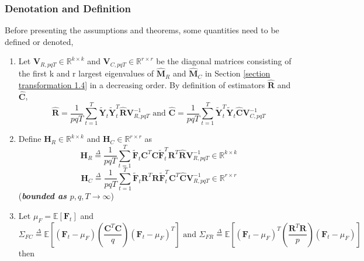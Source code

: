 \documentclass{article}[12pt]
\begin{document}
\subsubsection{Denotation and Definition}
Before presenting the assumptions and theorems, some quantities need to be defined or denoted, 
\begin{enumerate}
    \item  Let $\mathbf{V}_{R,pqT} \in \mathbb{R}^{k \times k}$ and $\mathbf{V}_{C,pqT} \in \mathbb{R}^{r \times r}$ be the diagonal matrices consisting of the first k and r largest eigenvalues of $\mathbf{\widehat{M}}_R$ and $\mathbf{\widehat{M}}_C$ in Section \ref{section transformation 1.4} in a decreasing order. By definition of estimators $\mathbf{\widehat{R}}$ and $\mathbf{\widehat{C}}$,
    \begin{equation}
       \mathbf{\widehat{R}} = \dfrac{1}{pqT}\sum_{t=1}^T\mathbf{\widetilde{Y}}_t\mathbf{\widetilde{Y}}_t^T \mathbf{\widehat{R}} \mathbf{V}_{R,pqT}^{-1} \text{ and } \mathbf{\widehat{C}} = \dfrac{1}{pqT}\sum_{t=1}^T\mathbf{\widetilde{Y}}_t^T\mathbf{\widetilde{Y}}_t \mathbf{\widehat{C}} \mathbf{V}_{C,pqT}^{-1}
    \end{equation}
    \item \noindent Define $\mathbf{H}_R \in \mathbb{R}^{k \times k}$ and $\mathbf{H}_C \in \mathbb{R}^{r \times r}$ as 
    \begin{equation}
       \mathbf{H}_R \overset{\Delta}{=} \dfrac{1}{pqT}\sum_{t=1}^T\mathbf{\widetilde{F}}_t\mathbf{C}^T\mathbf{C}\mathbf{\widetilde{F}}_t^T\mathbf{R}^T\mathbf{\widehat{R}}\mathbf{V}_{R,pqT}^{-1} \in \mathbb{R}^{k \times k}
    \end{equation}
    \begin{equation}
       \mathbf{H}_C \overset{\Delta}{=} \dfrac{1}{pqT}\sum_{t=1}^T\mathbf{\widetilde{F}}_t\mathbf{R}^T\mathbf{R}\mathbf{\widetilde{F}}_t^T\mathbf{C}^T\mathbf{\widehat{C}}\mathbf{V}_{R,pqT}^{-1} \in \mathbb{R}^{r \times r}
    \end{equation}
    \noindent (\textbf{\textit{bounded as $p,q,T \rightarrow \infty $}})
    \item Let $\mu_F = \mathbb{E}\left[\mathbf{F}_t\right]$ 
    and
    \begin{equation}
       \Sigma_{FC} \overset{\Delta}{=} \mathbb{E}\left[(\mathbf{F}_t-\mu_F)(\dfrac{\mathbf{C}^T\mathbf{C}}{q})(\mathbf{F}_t-\mu_F)^T\right] \text{ and } 
       \Sigma_{FR} \overset{\Delta}{=} \mathbb{E}\left[(\mathbf{F}_t-\mu_F)^T(\dfrac{\mathbf{R}^T\mathbf{R}}{p})(\mathbf{F}_t-\mu_F)\right] 
    \end{equation}
    then 


\end{enumerate}
\end{document}
